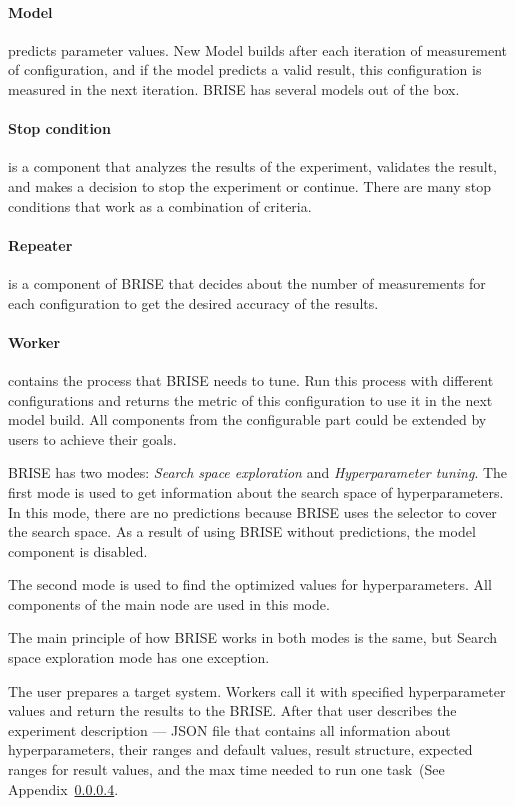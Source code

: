 \paragraph{Model} predicts parameter values. New Model builds after each iteration of measurement of configuration, and if the model predicts a valid result, this configuration is measured in the next iteration. BRISE has several models out of the box.
\paragraph{Stop condition} is a component that analyzes the results of the experiment, validates the result, and makes a decision to stop the experiment or continue. There are many stop conditions that work as a combination of criteria.
\paragraph{Repeater} is a component of BRISE that decides about the number of measurements for each configuration to get the desired accuracy of the results. 
\paragraph{Worker} contains the process that BRISE needs to tune. Run this process with different configurations and returns the metric of this configuration to use it in the next model build.
All components from the configurable part could be extended by users to achieve their goals.

BRISE has two modes: \textit{Search space exploration} and \textit{Hyperparameter tuning}.
The first mode is used to get information about the search space of hyperparameters. In this mode, there are no predictions because BRISE uses the selector to cover the search space. As a result of using BRISE without predictions, the model component is disabled.

The second mode is used to find the optimized values for hyperparameters. All components of the main node are used in this mode.

The main principle of how BRISE works in both modes is the same, but 
Search space exploration mode has one exception.

The user prepares a target system. Workers call it with specified hyperparameter values and return the results to the BRISE.
After that user describes the experiment description — JSON file that contains all information about hyperparameters, their ranges and default values, result structure, expected ranges for result values, and the max time needed to run one task~(See Appendix~\ref{}.

